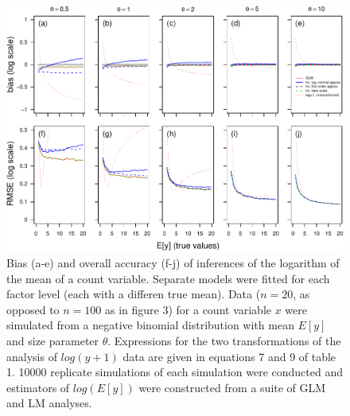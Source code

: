 \documentclass[]{article}
\begin{document}
\begin{figure}[h]

{\centering \includegraphics{revisiting_count_data_advice_files/figure-latex/biasAndRmseFigureLogSeparateModelsSmallN-1} 

}

\caption{Bias (a-e) and overall accuracy (f-j) of inferences of the logarithm of the mean of a count variable.  Separate models were fitted for each factor level (each with a differen true mean).  Data ($n=20$, as opposed to $n=100$ as in figure 3) for a count variable $x$ were simulated from a negative binomial distribution with mean $E[y]$ and size parameter $\theta$.  Expressions for the two transformations of the analysis of $log(y+1)$ data are given in equations 7 and 9 of table 1.  10000 replicate simulations of each simulation were conducted and estimators of $log(E[y])$ were constructed from a suite of GLM and LM analyses.}\label{fig:biasAndRmseFigureLogSeparateModelsSmallN}
\end{figure}
\end{document}
